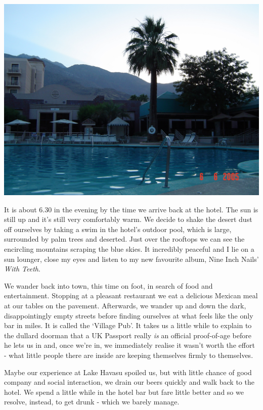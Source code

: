 \documentclass[a5paper,titlepage,11pt]{book}
\begin{document}
\begin{center}\includegraphics[width=\textwidth]{gfx/palmsprings_pool}\end{center}

It is about 6.30 in the evening by the time we arrive back at the hotel. The sun is still up and it's still very comfortably warm. We decide to shake the desert dust off ourselves by taking a swim in the hotel's outdoor pool, which is large, surrounded by palm trees and deserted. Just over the rooftops we can see the encircling mountains scraping the blue skies. It incredibly peaceful and I lie on a sun lounger, close my eyes and listen to my new favourite album, Nine Inch Nails' \emph{With Teeth}.

We wander back into town, this time on foot, in search of food and entertainment. Stopping at a pleasant restaurant we eat a delicious Mexican meal at our tables on the pavement. Afterwards, we wander up and down the dark, disappointingly empty streets before finding ourselves at what feels like the only bar in miles. It is called the `Village Pub'. It takes us a little while to explain to the dullard doorman that a UK Passport really \emph{is} an official proof-of-age before he lets us in and, once we're in, we immediately realise it wasn't worth the effort - what little people there are inside are keeping themselves firmly to themselves.

Maybe our experience at Lake Havasu spoiled us, but with little chance of good company and social interaction, we drain our beers quickly and walk back to the hotel. We spend a little while in the hotel bar but fare little better and so we resolve, instead, to get drunk - which we barely manage.
\end{document}
